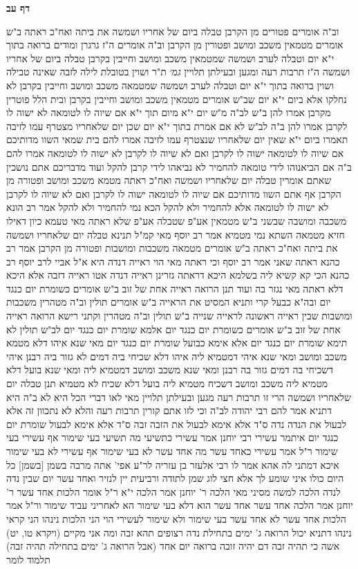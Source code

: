\documentclass[12pt, openany]{book}
\newcommand{\sethebfont}{
\fontsize{10.5pt}{21.0pt} \selectfont
}
\newcommand{\twocol}[1]{
	{\sethebfont \begin{multicols}{2}
			#1
	\end{multicols}}	
}
\newcommand{\sectname}{}
\newcommand{\newsection}[1]{
	\addcontentsline{toc}{section}{#1}
	\renewcommand{\sectname}{#1}	
	\vspace{-\baselineskip}
	\begin{center}
		\textbf{%
\fontsize{16pt}{16pt}\selectfont
			#1}
	\end{center}
	\vspace{-\baselineskip}
	\nopagebreak
}
\begin{document}
\newsection{דף עב}
\twocol{וב"ה אומרים פטורים מן הקרבן 
טבלה ביום של אחריו ושמשה את ביתה ואח"כ ראתה ב"ש אומרים מטמאין משכב ומושב ופטורין מן הקרבן 
וב"ה אומרים ה"ז גרגרן ומודים ברואה בתוך י"א יום וטבלה לערב ושמשה שמטמאין משכב ומושב וחייבין בקרבן 
טבלה ביום של אחריו ושמשה ה"ז תרבות רעה ומגען ובעילתן תלויין
{\large\emph{גמ׳}} ת"ר ושוין בטובלת לילה לזבה שאינה טבילה ושוין ברואה בתוך י"א יום וטבלה לערב ושמשה שמטמאה משכב ומושב וחייבין בקרבן 
לא נחלקו אלא ביום י"א יום שב"ש אומרים מטמאין משכב ומושב וחייבין בקרבן ובית הלל פוטרין מקרבן 
אמרו להן ב"ש לב"ה מ"ש יום י"א מיום תוך י"א אם שיוה לו לטומאה לא ישוה לו לקרבן 
אמרו להן ב"ה לב"ש לא אם אמרת בתוך י"א יום שכן יום שלאחריו מצטרף עמו לזיבה תאמרו ביום י"א שאין יום שלאחריו שנצטרף עמו לזיבה 
אמרו להם בית שמאי השוו מדותיכם אם שיוה לו לטומאה ישוה לו לקרבן ואם לא שיוה לו לקרבן לא ישוה לו לטומאה 
אמרו להם ב"ה אם הביאנוהו לידי טומאה להחמיר לא נביאהו לידי קרבן להקל 
ועוד מדבריכם אתם נושכין שאתם אומרין טבלה יום שלאחריו ושמשה ואח"כ ראתה מטמא משכב ומושב ופטורה מן הקרבן אף אתם השוו מדותיכם אם שיוה לו לטומאה ישוה לו לקרבן
ואם לא שיוה לו לקרבן לא ישוה לו לטומאה אלא להחמיר ולא להקל הכא נמי להחמיר ולא להקל 
אמר רב הונא משכבה ומושבה שבשני ב"ש מטמאין אע"פ שטבלה אע"פ שלא ראתה מאי טעמא כיון דאילו חזיא מטמאה השתא נמי מטמיא 
אמר רב יוסף מאי קמ"ל תנינא טבלה יום שלאחריו ושמשה את ביתה ואח"כ ראתה ב"ש אומרים מטמאה משכבות ומושבות ופטורה מן הקרבן 
אמר רב כהנא ראתה שאני 
אמר רב יוסף וכי ראתה מאי הוי ראייה דנדה היא 
א"ל אביי לרב יוסף רב כהנא הכי קא קשיא ליה בשלמא היכא דראתה גזרינן ראייה דנדה אטו ראייה דזבה אלא היכא דלא ראתה מאי נגזר בה 
ועוד תנן הרואה ראייה אחת של זוב ב"ש אומרים כשומרת יום כנגד יום ובה"א כבעל קרי
ותניא המסיט את הראייה ב"ש אומרים תולין וב"ה מטהרין 
משכבות ומושבות שבין ראייה ראשונה לראייה שנייה ב"ש תולין וב"ה מטהרין 
וקתני רישא הרואה ראייה אחת של זוב ב"ש אומרים כשומרת יום כנגד יום אלמא שומרת יום כנגד יום לב"ש תולין 
לא תימא שומרת יום כנגד יום אלא אימא כבועל שומרת יום כנגד יום 
מאי שנא איהו דלא מטמא משכב ומושב ומאי שנא איהי דמטמיא ליה 
איהו דלא שכיחי ביה דמים לא גזור ביה רבנן איהי דשכיחי בה דמים גזור בה רבנן 
ומאי שנא משכב ומושב דמטמיא ליה ומאי שנא בועל דלא מטמיא ליה 
משכב ומושב דשכיח מטמיא ליה בועל דלא שכיח לא מטמיא 
תנן טבלה יום שלאחריו ושמשה הרי זו תרבות רעה
מגען ובעילתן תלויין מאי לאו דברי הכל היא 
לא ב"ה היא דתניא אמר להם רבי יהודה לב"ה וכי לזו אתם קורין תרבות רעה והלא לא נתכוון זה אלא לבעול את הנדה נדה ס"ד 
אלא אימא לבעול את הזבה זבה ס"ד אלא אימא לבעול שומרת יום כנגד יום 
איתמר עשירי רבי יוחנן אמר עשירי כתשיעי מה תשיעי בעי שימור אף עשירי בעי שימור 
ר"ל אמר עשירי כאחד עשר מה אחד עשר לא בעי שימור אף עשירי לא בעי שימור 
איכא דמתני לה אהא אמר לו רבי אלעזר בן עזריה לר"ע אפי' אתה מרבה בשמן [בשמן] כל היום כולו איני שומע לך אלא חצי לוג שמן לתודה ורביעית יין לנזיר ואחד עשר יום שבין נדה לנדה הלכה למשה מסיני 
מאי הלכה ר' יוחנן אמר הלכה י"א ר"ל אומר הלכות אחד עשר 
ר' יוחנן אמר הלכה אחד עשר אחד עשר הוא דלא בעי שימור הא לאחריני עביד שימור ור"ל אמר הלכות אחד עשר לא אחד עשר בעי שימור ולא שימור לעשירי הוי 
הני הלכות נינהו הני קראי נינהו דתניא יכול הרואה ג' ימים בתחילת נדה רצופים תהא זבה 
ומה אני מקיים (ויקרא טו, יט) אשה כי תהיה זבה דם יהיה זובה ברואה יום אחד (אבל הרואה ג' ימים בתחילה תהיה זבה) תלמוד לומר}
\end{document}

